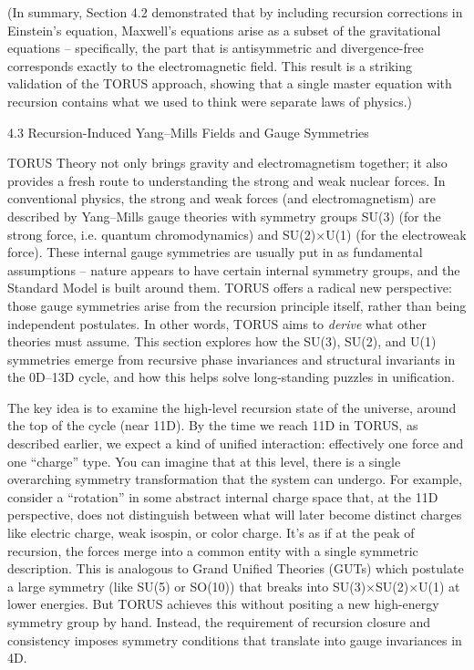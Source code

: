 \documentclass[
]{article}
\begin{document}
(In summary, Section 4.2 demonstrated that by including recursion
corrections in Einstein's equation, Maxwell's equations arise as a
subset of the gravitational equations -- specifically, the part that is
antisymmetric and divergence-free corresponds exactly to the
electromagnetic field. This result is a striking validation of the TORUS
approach, showing that a single master equation with recursion contains
what we used to think were separate laws of physics.)

4.3 Recursion-Induced Yang--Mills Fields and Gauge Symmetries

TORUS Theory not only brings gravity and electromagnetism together; it
also provides a fresh route to understanding the strong and weak nuclear
forces. In conventional physics, the strong and weak forces (and
electromagnetism) are described by Yang--Mills gauge theories with
symmetry groups SU(3) (for the strong force, i.e. quantum
chromodynamics) and SU(2)×U(1) (for the electroweak force). These
internal gauge symmetries are usually put in as fundamental assumptions
-- nature appears to have certain internal symmetry groups, and the
Standard Model is built around them. TORUS offers a radical new
perspective: those gauge symmetries arise from the recursion principle
itself, rather than being independent postulates. In other words, TORUS
aims to \emph{derive} what other theories must assume. This section
explores how the SU(3), SU(2), and U(1) symmetries emerge from recursive
phase invariances and structural invariants in the 0D--13D cycle, and
how this helps solve long-standing puzzles in unification.

The key idea is to examine the high-level recursion state of the
universe, around the top of the cycle (near 11D). By the time we reach
11D in TORUS, as described earlier, we expect a kind of unified
interaction: effectively one force and one ``charge'' type. You can
imagine that at this level, there is a single overarching symmetry
transformation that the system can undergo. For example, consider a
``rotation'' in some abstract internal charge space that, at the 11D
perspective, does not distinguish between what will later become
distinct charges like electric charge, weak isospin, or color charge.
It's as if at the peak of recursion, the forces merge into a common
entity with a single symmetric description. This is analogous to Grand
Unified Theories (GUTs) which postulate a large symmetry (like SU(5) or
SO(10)) that breaks into SU(3)×SU(2)×U(1) at lower energies. But TORUS
achieves this without positing a new high-energy symmetry group by hand.
Instead, the requirement of recursion closure and consistency imposes
symmetry conditions that translate into gauge invariances in 4D.
\end{document}
